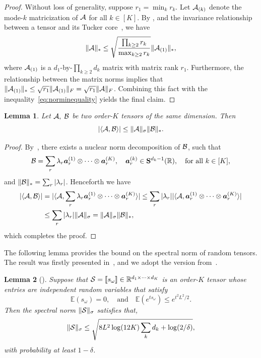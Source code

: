 \documentclass[11pt]{article}
\theoremstyle{plain}
\newtheorem{lem}{Lemma}
\theoremstyle{definition}
\begin{document}
\begin{proof}
Without loss of generality, suppose $r_1=\min_k r_k$. Let $\mathcal{A}_{(k)}$ denote the mode-$k$ matricization of $\mathcal{A}$ for all $k\in[K]$. By \citet[Corollary 4.11]{wang2017operator}, and the invariance relationship between a tensor and its Tucker core~\citep[Section 6]{jiang2017tensor}, we have
\begin{equation}\label{eq:norminequality}
\lVert\mathcal{A}\rVert_* \leq \sqrt{\prod_{k\geq 2} r_k \over \max_{k\geq 2} r_k} \lVert\mathcal{A}_{(1)}\rVert_*,
\end{equation}
where $\mathcal{A}_{(1)}$ is a $d_1$-by-$\prod_{k\geq 2}d_k$ matrix with matrix rank $r_1$. Furthermore, the relationship between the matrix norms implies that $\lVert\mathcal{A}_{(1)}\rVert_*\leq \sqrt{r_1}\lVert\mathcal{A}_{(1)}\rVert_F=\sqrt{r_1}\lVert\mathcal{A}\rVert_F$. Combining this fact with the inequality~\eqref{eq:norminequality} yields the final claim.
\end{proof}



\begin{lem} \label{lem:inq}
Let $\mathcal{A}, \; \mathcal{B}$ be two order-$K$ tensors of the same dimension. Then
\[
|\langle \mathcal{A},\mathcal{B}\rangle| \leq \lVert\mathcal{A}\rVert_\sigma   \lVert\mathcal{B}\rVert_*.
\]
\end{lem}

\begin{proof}
By~\citet[Proposition 3.1]{friedland2018nuclear}, there exists a nuclear norm decomposition of $\mathcal{B}$, such that
\[
\mathcal{B}=\sum_{r} \lambda_r \bm{a}^{(1)}_r\otimes \cdots\otimes \bm{a}^{(K)}_r,\quad \bm{a}_r^{(k)}\in\mathbf{S}^{d_k-1}(\mathbb{R}),\quad \text{for all }k\in[K],
\]
and $\lVert\mathcal{B}\rVert_*=\sum_{r}|\lambda_r|$. Henceforth we have
\begin{align*}
|\langle \mathcal{A},\mathcal{B}\rangle|&=| \langle \mathcal{A}, \sum_{r} \lambda_r \bm{a}^{(1)}_r\otimes \cdots\otimes \bm{a}^{(K)}_r \rangle|\leq \sum_r |\lambda_r| |\langle \mathcal{A}, \bm{a}^{(1)}_r \otimes \cdots\otimes \bm{a}^{(K)}_r \rangle|\\
&\leq \sum_{r}|\lambda_r| \lVert\mathcal{A}\rVert_\sigma= \lVert\mathcal{A}\rVert_\sigma\lVert\mathcal{B}\rVert_*,
\end{align*}
which completes the proof.
\end{proof}


The following lemma provides the bound on the spectral norm of random tensors. The result was firstly presented in~\cite{nguyen2015tensor}, and we adopt the version from~\cite{tomioka2014spectral}.
\begin{lem}[\cite{tomioka2014spectral}]\label{lem:tensor}
Suppose that $\mathcal{S}=\llbracket s_{\omega} \rrbracket\in\mathbb{R}^{d_1\times \cdots \times d_K}$ is an order-$K$ tensor whose entries are independent random variables that satisfy
\[
\mathbb{E}(s_{\omega})=0,\quad \text{and} \quad\mathbb{E}(e^{ts_{\omega}})\leq e^{t^2L^2/2}.
\]
Then the spectral norm $\lVert\mathcal{S}\rVert_\sigma$ satisfies that,
\[
\lVert\mathcal{S}\rVert_\sigma\leq \sqrt{{8L^2} \log (12K) \sum_k d_k +\log (2/\delta)},
\]
with probability at least $1-\delta$.
\end{lem}
\end{document}
